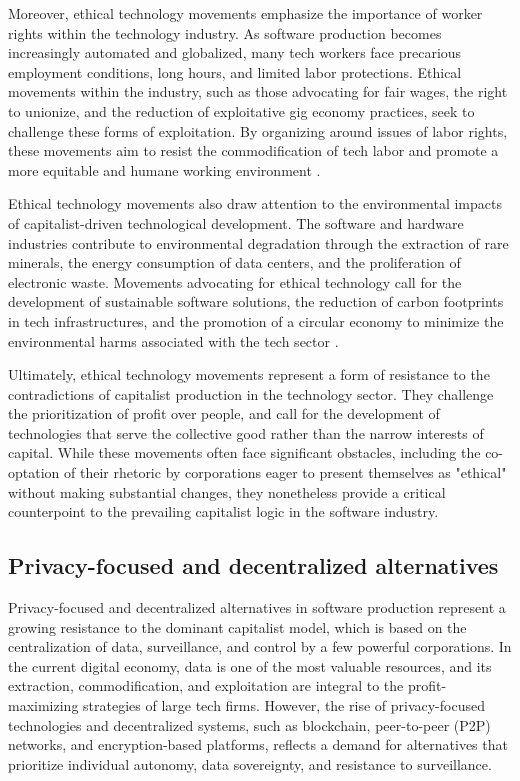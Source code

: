 Moreover, ethical technology movements emphasize the importance of worker rights within the technology industry. As software production becomes increasingly automated and globalized, many tech workers face precarious employment conditions, long hours, and limited labor protections. Ethical movements within the industry, such as those advocating for fair wages, the right to unionize, and the reduction of exploitative gig economy practices, seek to challenge these forms of exploitation. By organizing around issues of labor rights, these movements aim to resist the commodification of tech labor and promote a more equitable and humane working environment \cite[pp.~67-69]{scholz2016}.

Ethical technology movements also draw attention to the environmental impacts of capitalist-driven technological development. The software and hardware industries contribute to environmental degradation through the extraction of rare minerals, the energy consumption of data centers, and the proliferation of electronic waste. Movements advocating for ethical technology call for the development of sustainable software solutions, the reduction of carbon footprints in tech infrastructures, and the promotion of a circular economy to minimize the environmental harms associated with the tech sector \cite[pp.~121-124]{maxwell2014}.

Ultimately, ethical technology movements represent a form of resistance to the contradictions of capitalist production in the technology sector. They challenge the prioritization of profit over people, and call for the development of technologies that serve the collective good rather than the narrow interests of capital. While these movements often face significant obstacles, including the co-optation of their rhetoric by corporations eager to present themselves as "ethical" without making substantial changes, they nonetheless provide a critical counterpoint to the prevailing capitalist logic in the software industry.

\subsection{Privacy-focused and decentralized alternatives}

Privacy-focused and decentralized alternatives in software production represent a growing resistance to the dominant capitalist model, which is based on the centralization of data, surveillance, and control by a few powerful corporations. In the current digital economy, data is one of the most valuable resources, and its extraction, commodification, and exploitation are integral to the profit-maximizing strategies of large tech firms. However, the rise of privacy-focused technologies and decentralized systems, such as blockchain, peer-to-peer (P2P) networks, and encryption-based platforms, reflects a demand for alternatives that prioritize individual autonomy, data sovereignty, and resistance to surveillance.

